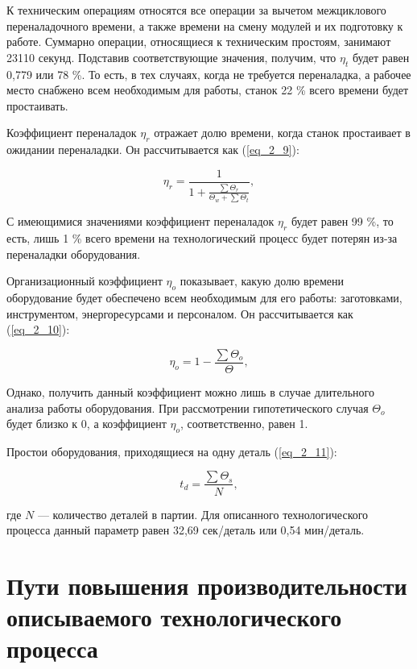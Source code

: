 К техническим операциям относятся все операции за вычетом межциклового переналадочного времени, а также времени на смену модулей и их подготовку к работе. Суммарно операции, относящиеся к техническим простоям, занимают 23110 секунд. Подставив соответствующие значения, получим, что $\eta_t$ будет равен 0,779 или 78 \%. То есть, в тех случаях, когда не требуется переналадка, а рабочее место снабжено всем необходимым для работы, станок 22 \% всего времени будет простаивать.

Коэффициент переналадок $\eta_r$ отражает долю времени, когда станок простаивает в ожидании переналадки. Он рассчитывается как (\ref{eq_2_9}):

\begin{equation}
\eta_r = \frac{1}{1 + \frac{\sum \Theta_r}{\Theta_w + \sum \Theta_t}},
\label{eq_2_9}
\end{equation}

С имеющимися значениями коэффициент переналадок $\eta_r$ будет равен 99 \%, то есть, лишь 1 \% всего времени на технологический процесс будет потерян из-за переналадки оборудования.

Организационный коэффициент $\eta_o$ показывает, какую долю времени оборудование будет обеспечено всем необходимым для его работы: заготовками, инструментом, энергоресурсами и персоналом. Он рассчитывается как (\ref{eq_2_10}):

\begin{equation}
\eta_o = 1 - \frac{\sum \Theta_o}{\Theta},
\label{eq_2_10}
\end{equation}

Однако, получить данный коэффициент можно лишь в случае длительного анализа работы оборудования. При рассмотрении гипотетического случая $\Theta_o$ будет близко к 0, а коэффициент $\eta_o$, соответственно, равен 1.

Простои оборудования, приходящиеся на одну деталь (\ref{eq_2_11}):

\begin{equation}
t_d = \frac{\sum \Theta_s}{N},
\label{eq_2_11}
\end{equation}

где $N$ --- количество деталей в партии. Для описанного технологического процесса данный параметр равен 32,69 сек/деталь или 0,54 мин/деталь.

\section{Пути повышения производительности описываемого технологического процесса} \label{sect2_4}

